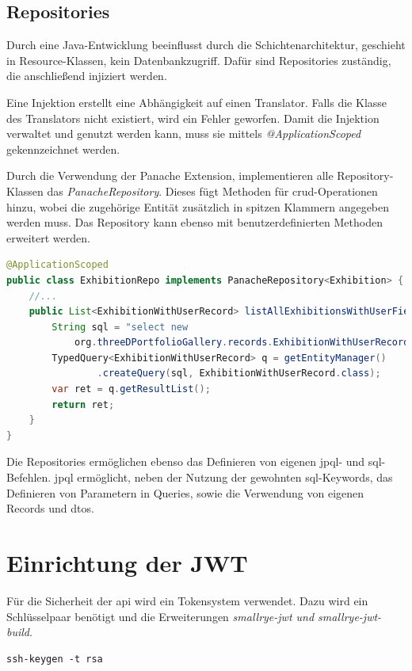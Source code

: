 \subsection{Repositories} 

Durch eine Java-Entwicklung beeinflusst durch die Schichtenarchitektur, geschieht in Resource-Klassen, kein Datenbankzugriff. 
Dafür sind Repositories zuständig, die anschließend injiziert werden. 
\cite{SchichtenmusterAbout}

Eine Injektion erstellt eine Abhängigkeit auf einen Translator. 
Falls die Klasse des Translators nicht existiert, wird ein Fehler geworfen. 
Damit die Injektion verwaltet und genutzt werden kann, muss sie mittels \emph{@ApplicationScoped} gekennzeichnet werden. 
\cite{beanAbout}

Durch die Verwendung der Panache Extension, implementieren alle Repository-Klassen das \emph{PanacheRepository}.
Dieses fügt Methoden für \gls{crud}-Operationen hinzu, wobei die zugehörige Entität zusätzlich in spitzen Klammern angegeben werden muss. 
Das Repository kann ebenso mit benutzerdefinierten Methoden erweitert werden. 

\begin{lstlisting}[label=lst:panacherepo, language=Java, caption=Ausschnitt aus dem Exhibition Repository]
@ApplicationScoped
public class ExhibitionRepo implements PanacheRepository<Exhibition> {
    //...
    public List<ExhibitionWithUserRecord> listAllExhibitionsWithUserField() {
        String sql = "select new 
            org.threeDPortfolioGallery.records.ExhibitionWithUserRecord(e, u.user_name, u.icon_url) from Exhibition e join e.user u left join e.categories c";
        TypedQuery<ExhibitionWithUserRecord> q = getEntityManager()
                .createQuery(sql, ExhibitionWithUserRecord.class);
        var ret = q.getResultList();
        return ret;
    }
}
\end{lstlisting}

Die Repositories ermöglichen ebenso das Definieren von eigenen \gls{jpql}- und \gls{sql}-Befehlen. 
\gls{jpql} ermöglicht, neben der Nutzung der gewohnten \gls{sql}-Keywords, das Definieren von Parametern in Queries, sowie die Verwendung von eigenen Records und \gls{dto}s.

\section{Einrichtung der JWT}
\label{chap:jwt}
Für die Sicherheit der \gls{api} wird ein Tokensystem verwendet. 
Dazu wird ein Schlüsselpaar benötigt und die Erweiterungen \emph{smallrye-jwt und smallrye-jwt-build}.
\cite{jwtAboutQuarkus}
\begin{lstlisting}[label=lst:sshkeygen, caption=Erstellung eines Schlüsselpaars]
ssh-keygen -t rsa
\end{lstlisting}


